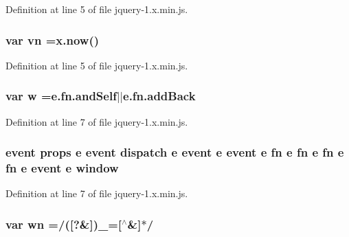 Definition at line 5 of file jquery-\/1.\+x.\+min.\+js.

\subsubsection[{\texorpdfstring{vn}{vn}}]{\setlength{\rightskip}{0pt plus 5cm}var vn =x.\+now()}\hypertarget{jquery-1_8x_8min_8js_a4d3ea42bab8c1a36105c29b5a098a050}{}\label{jquery-1_8x_8min_8js_a4d3ea42bab8c1a36105c29b5a098a050}


Definition at line 5 of file jquery-\/1.\+x.\+min.\+js.

\subsubsection[{\texorpdfstring{w}{w}}]{\setlength{\rightskip}{0pt plus 5cm}var w ={\bf e.\+fn.\+and\+Self}$\vert$$\vert$e.\+fn.\+add\+Back}\hypertarget{jquery-1_8x_8min_8js_a9721a992655f700bdc2e91ba68b71e26}{}\label{jquery-1_8x_8min_8js_a9721a992655f700bdc2e91ba68b71e26}


Definition at line 7 of file jquery-\/1.\+x.\+min.\+js.

\subsubsection[{\texorpdfstring{window}{window}}]{ event props {\bf e} event dispatch {\bf e} event {\bf e} event {\bf e} {\bf fn} {\bf e} {\bf fn} {\bf e} {\bf fn} {\bf e} {\bf fn} {\bf e} event {\bf e} window}\hypertarget{jquery-1_8x_8min_8js_a09a0b073bdca48a515d6d31fc736a2bc}{}\label{jquery-1_8x_8min_8js_a09a0b073bdca48a515d6d31fc736a2bc}


Definition at line 7 of file jquery-\/1.\+x.\+min.\+js.

\subsubsection[{\texorpdfstring{wn}{wn}}]{\setlength{\rightskip}{0pt plus 5cm}var wn =/(\mbox{[}?\&\mbox{]})\+\_\+=\mbox{[}$^\wedge$\&\mbox{]}$\ast$/}\hypertarget{jquery-1_8x_8min_8js_aaa87ec69cc4d144180280e906cac73f1}{}\label{jquery-1_8x_8min_8js_aaa87ec69cc4d144180280e906cac73f1}


